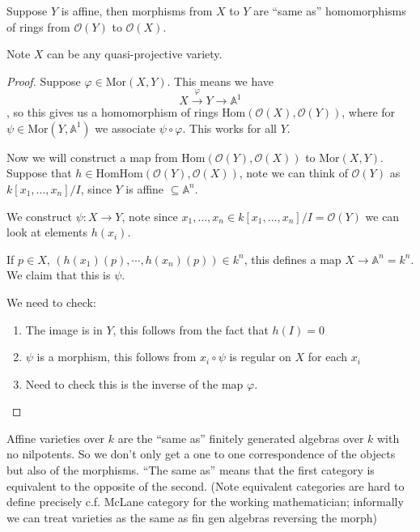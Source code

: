 \begin{theorem}
    Suppose $Y$ is affine, then morphisms from $X$ to $Y$ are ``same as'' homomorphisms of rings from $\mathcal{O}(Y)$ to $\mathcal{O}(X)$.

    Note $X$ can be any quasi-projective variety.

    \begin{proof}
    Suppose $\varphi\in \text{Mor}(X,Y)$. This means we have \[X\overset{\varphi}{\rightarrow} Y\rightarrow \mathbb{A}^1\], so this gives us a homomorphism of rings $\text{Hom}(\mathcal{O}(X),\mathcal{O}(Y))$, where for $\psi\in \text{Mor}(Y,\mathbb{A}^1)$ we associate $\psi\circ \varphi$.
This works for all $Y$.

Now we will construct a map from $\text{Hom}(\mathcal{O}(Y),\mathcal{O}(X))$ to $\text{Mor}(X,Y)$. Suppose that $h\in \text{Hom}\text{Hom}(\mathcal{O}(Y),\mathcal{O}(X))$, note we can think of $\mathcal{O}(Y)$ as $k[x_1,\ldots,x_n]/I$, since $Y$ is affine $\subseteq \mathbb{A}^n$.


We construct $\psi\colon X\rightarrow Y$, note since $x_1,\ldots,x_n\in k[x_1,\ldots,x_n]/I = \mathcal{O}(Y)$ we can look at elements $h(x_i)$.

If $p\in X$, $(h(x_1)(p),\cdots,h(x_n)(p))\in k^n$, this defines a map $X\rightarrow \mathbb{A}^n = k^n$. We claim that this is $\psi$.
\begin{exercise}
    We need to check:\begin{enumerate}
        \item The image is in $Y$, this follows from the fact that $h(I) = 0$
        \item $\psi$ is a morphism, this follows from $x_i\circ\psi$ is regular on $X$ for each $x_i$
        \item Need to check this is the inverse of the map $\varphi$.
    \end{enumerate}        
\end{exercise}
\end{proof}

Affine varieties over $k$ are the ``same as'' finitely generated algebras over $k$ with no nilpotents. So we don't only get a one to one correspondence of the objects but also of the morphisms. ``The same as'' means that the first category is equivalent to the opposite of the second. (Note equivalent categories are hard to define precisely c.f. McLane category for the working mathematician; informally we can treat varieties as the same as fin gen algebras reversing the morph)


\end{theorem}
